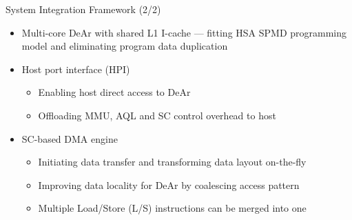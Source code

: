 \documentclass{beamer}
\begin{document}
\begin{CJK}{UTF8}{bkai}
    \begin{frame}{System Integration Framework (2/2)}
        \begin{itemize}
            \item Multi-core DeAr with shared L1 I-cache --- fitting HSA SPMD programming model and eliminating program data duplication
            \item Host port interface (HPI)
                \begin{itemize}
                    \item Enabling host direct access to DeAr
                    \item Offloading MMU, AQL and SC control overhead to host
                \end{itemize}
            \item SC-based DMA engine
                \begin{itemize}
                    \item Initiating data transfer and transforming data layout on-the-fly
                    \item Improving data locality for DeAr by coalescing access pattern
                    \item Multiple Load/Store (L/S) instructions can be merged into one
                \end{itemize}
        \end{itemize}
    \end{frame}


\end{CJK}
\end{document}
